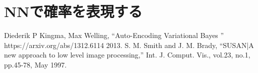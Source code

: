 \documentclass{ujarticle}
\begin{document}
\section{NNで確率を表現する}
\label{sec:NNで確率を表現する}



\begin{thebibliography}{9}
   Diederik P Kingma, Max Welling,
    ``Auto-Encoding Variational Bayes '' https://arxiv.org/abs/1312.6114 2013.
   S. M. Smith and J. M. Brady,
    ``SUSAN|A new approach to low level image processing,'' Int. J. Comput.
    Vis., vol.23, no.1, pp.45-78, May 1997.
\end{thebibliography}
\end{document}
